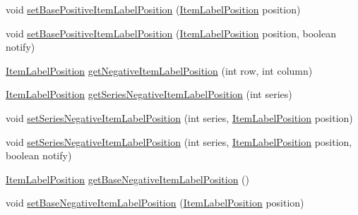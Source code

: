 \begin{DoxyCompactItemize}
\item 
void \mbox{\hyperlink{classorg_1_1jfree_1_1chart_1_1renderer_1_1_abstract_renderer_aef3b9adf36f2b4e30112230e960ec5d7}{set\+Base\+Positive\+Item\+Label\+Position}} (\mbox{\hyperlink{classorg_1_1jfree_1_1chart_1_1labels_1_1_item_label_position}{Item\+Label\+Position}} position)
\item 
void \mbox{\hyperlink{classorg_1_1jfree_1_1chart_1_1renderer_1_1_abstract_renderer_a3a6a1583114dd9d464459509d0fde01b}{set\+Base\+Positive\+Item\+Label\+Position}} (\mbox{\hyperlink{classorg_1_1jfree_1_1chart_1_1labels_1_1_item_label_position}{Item\+Label\+Position}} position, boolean notify)
\item 
\mbox{\hyperlink{classorg_1_1jfree_1_1chart_1_1labels_1_1_item_label_position}{Item\+Label\+Position}} \mbox{\hyperlink{classorg_1_1jfree_1_1chart_1_1renderer_1_1_abstract_renderer_ade5ebf7f08f0b93908ac4b1eb0099902}{get\+Negative\+Item\+Label\+Position}} (int row, int column)
\item 
\mbox{\hyperlink{classorg_1_1jfree_1_1chart_1_1labels_1_1_item_label_position}{Item\+Label\+Position}} \mbox{\hyperlink{classorg_1_1jfree_1_1chart_1_1renderer_1_1_abstract_renderer_a2ec8c993651d531262e314d8b1336756}{get\+Series\+Negative\+Item\+Label\+Position}} (int series)
\item 
void \mbox{\hyperlink{classorg_1_1jfree_1_1chart_1_1renderer_1_1_abstract_renderer_a308ce803c5fb75f2804b6f54d24877f5}{set\+Series\+Negative\+Item\+Label\+Position}} (int series, \mbox{\hyperlink{classorg_1_1jfree_1_1chart_1_1labels_1_1_item_label_position}{Item\+Label\+Position}} position)
\item 
void \mbox{\hyperlink{classorg_1_1jfree_1_1chart_1_1renderer_1_1_abstract_renderer_adc16846df5676475814ee85d04a22f2d}{set\+Series\+Negative\+Item\+Label\+Position}} (int series, \mbox{\hyperlink{classorg_1_1jfree_1_1chart_1_1labels_1_1_item_label_position}{Item\+Label\+Position}} position, boolean notify)
\item 
\mbox{\hyperlink{classorg_1_1jfree_1_1chart_1_1labels_1_1_item_label_position}{Item\+Label\+Position}} \mbox{\hyperlink{classorg_1_1jfree_1_1chart_1_1renderer_1_1_abstract_renderer_aa258bdeed3dd89d9de396d3c4e65d541}{get\+Base\+Negative\+Item\+Label\+Position}} ()
\item 
void \mbox{\hyperlink{classorg_1_1jfree_1_1chart_1_1renderer_1_1_abstract_renderer_a7b884e49e671f85f564084b3be63aa3d}{set\+Base\+Negative\+Item\+Label\+Position}} (\mbox{\hyperlink{classorg_1_1jfree_1_1chart_1_1labels_1_1_item_label_position}{Item\+Label\+Position}} position)

\end{DoxyCompactItemize}
